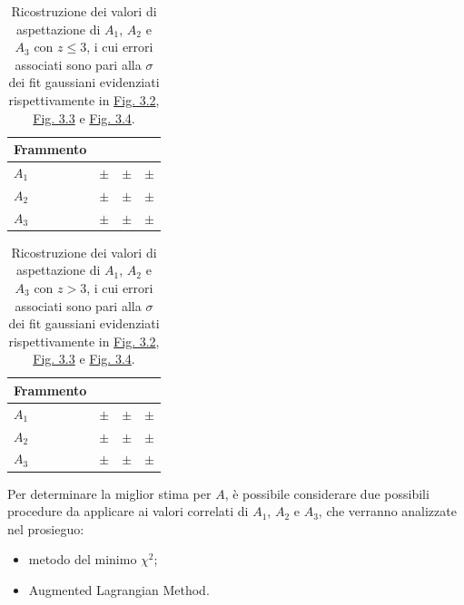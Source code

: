 \documentclass[12pt,a4paper,twoside]{report}
\begin{document}
	\begin{table}[H]
		\begin{minipage}{\textwidth}
			\centering
			\begin{tabular}{ |M{2.0cm}||M{3.0cm}|M{3.0cm}|M{3.0cm}| }
				\hline
				Frammento &&&\\
				\hline
				$A_1$& $\pm$& $\pm$ &$\pm$\\
				\hline
				$A_2$& $\pm$& $\pm$ &$\pm$\\
				\hline
				$A_3$& $\pm$& $\pm$ &$\pm$\\
				\hline
			\end{tabular}
		\end{minipage}
		\caption{Ricostruzione dei valori di aspettazione di $A_1$, $A_2$ e $A_3$ con $z\le3$, i cui errori associati sono pari alla $\sigma$ dei fit gaussiani evidenziati rispettivamente in \hyperref[fig:a1]{Fig. 3.2}, \hyperref[fig:a2]{Fig. 3.3} e \hyperref[fig:a3]{Fig. 3.4}.}
		\label{tab:mass_numbers_a}
	\end{table}
	\begin{table}[H]
		\begin{minipage}{\textwidth}
			\centering
			\begin{tabular}{ |M{2.0cm}||M{3.0cm}|M{3.0cm}|M{3.0cm}| }
				\hline
				Frammento &&&\\
				\hline
				$A_1$& $\pm$& $\pm$ &$\pm$\\
				\hline
				$A_2$& $\pm$& $\pm$ &$\pm$\\
				\hline
				$A_3$& $\pm$& $\pm$ &$\pm$\\
				\hline
			\end{tabular}
		\end{minipage}
		\caption{Ricostruzione dei valori di aspettazione di $A_1$, $A_2$ e $A_3$ con $z>3$, i cui errori associati sono pari alla $\sigma$ dei fit gaussiani evidenziati rispettivamente in \hyperref[fig:a1]{Fig. 3.2}, \hyperref[fig:a2]{Fig. 3.3} e \hyperref[fig:a3]{Fig. 3.4}.}
		\label{tab:mass_numbers_b}
	\end{table}
	Per determinare la miglior stima per $A$, è possibile considerare due possibili procedure da applicare ai valori correlati di $A_1$, $A_2$ e $A_3$, che verranno analizzate nel prosieguo:
	\begin{itemize}
		\item metodo del minimo $\chi^2$;
		\item Augmented Lagrangian Method.
	\end{itemize}
	
\end{document}

